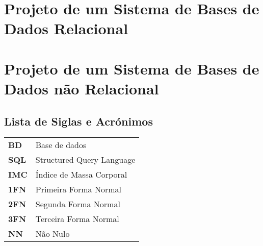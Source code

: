 \documentclass[a4paper, twoside]{report}
\begin{document}


\tableofcontents
\listoffigures
\listoftables
\lstlistoflistings

\part{Projeto de um Sistema de Bases de Dados Relacional}







\part{Projeto de um Sistema de Bases de Dados não Relacional}






\chapter*{Lista de Siglas e Acrónimos}
\begin{table}[h]
    \begin{tabular}{ll}
    \textbf{BD}  & Base de dados\\
    \textbf{SQL} & Structured Query Language\\
    \textbf{IMC} & Índice de Massa Corporal\\
    \textbf{1FN} & Primeira Forma Normal\\
    \textbf{2FN} & Segunda Forma Normal\\
    \textbf{3FN} & Terceira Forma Normal\\
    \textbf{NN}  & Não Nulo
    \end{tabular}
\end{table}





\end{document}

